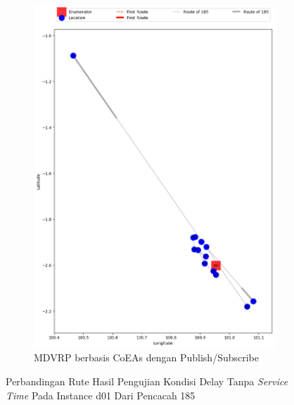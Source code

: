 \begin{figure}[H]\ContinuedFloat
	\centering
	\begin{subfigure}[t]{\textwidth}
		\centering
		\includegraphics[width=\textwidth]{Resources/Images/delayed_1/real_m15_n100_delayed_1_185_pubsub_coes}
		\caption{MDVRP berbasis CoEAs dengan Publish/Subscribe}
		\label{fig:real_m15_n100_delayed_1_185_pubsub_coes}
	\end{subfigure}
	\caption{Perbandingan Rute Hasil Pengujian Kondisi Delay Tanpa \textit{Service Time} Pada Instance d01 Dari Pencacah 185}
	\label{fig:real_m15_n100_delayed_1_185_contd}
\end{figure}


